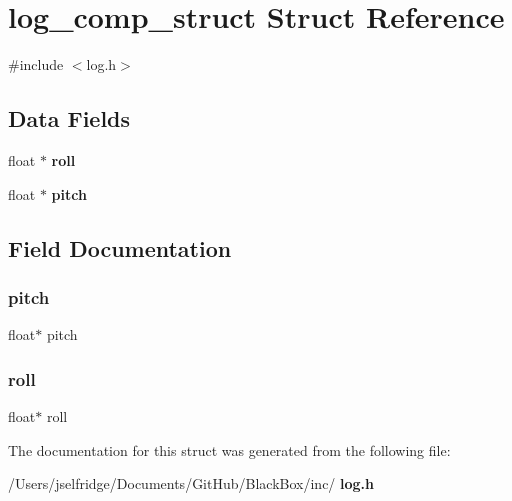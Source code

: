 \section{log\+\_\+comp\+\_\+struct Struct Reference}
\label{structlog__comp__struct}


{\ttfamily \#include $<$log.\+h$>$}

\subsection*{Data Fields}
\begin{DoxyCompactItemize}
\item 
float $\ast$ \textbf{ roll}
\item 
float $\ast$ \textbf{ pitch}
\end{DoxyCompactItemize}


\subsection{Field Documentation}
\mbox{\label{structlog__comp__struct_a75d9a676ae166ee09862cfe131c505b8}} 
\subsubsection{pitch}
{\footnotesize\ttfamily float$\ast$ pitch}

\mbox{\label{structlog__comp__struct_a9b85501c6dfe6ba60166fbf81fb16cc3}} 
\subsubsection{roll}
{\footnotesize\ttfamily float$\ast$ roll}



The documentation for this struct was generated from the following file\+:\begin{DoxyCompactItemize}
\item 
/\+Users/jselfridge/\+Documents/\+Git\+Hub/\+Black\+Box/inc/\textbf{ log.\+h}\end{DoxyCompactItemize}
